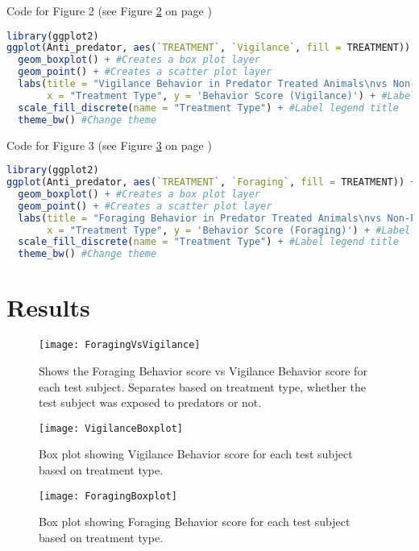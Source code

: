 \documentclass[letterpaper]{article}
\begin{document}
Code for Figure 2 (see Figure \ref{fig:2} on page \pageref{fig:2})
\begin{lstlisting}[language = R]
library(ggplot2)
ggplot(Anti_predator, aes(`TREATMENT`, `Vigilance`, fill = TREATMENT)) + #Using Anti_predator dataset, call for TREATMENT as my x-value and Vigilance for my y-values, also colors box plots based on treatment type
  geom_boxplot() + #Creates a box plot layer
  geom_point() + #Creates a scatter plot layer
  labs(title = "Vigilance Behavior in Predator Treated Animals\nvs Non-Predator Treated Animals",
       x = "Treatment Type", y = 'Behavior Score (Vigilance)') + #Label title, x-axis, and y-axis
  scale_fill_discrete(name = "Treatment Type") + #Label legend title
  theme_bw() #Change theme
\end{lstlisting}

Code for Figure 3 (see Figure \ref{fig:3} on page \pageref{fig:3})
\begin{lstlisting}[language = R]
library(ggplot2)
ggplot(Anti_predator, aes(`TREATMENT`, `Foraging`, fill = TREATMENT)) + #Using Anti_predator dataset, call for TREATMENT as my x-value and Foraging for my y-values, also colors box plots based on treatment type
  geom_boxplot() + #Creates a box plot layer 
  geom_point() + #Creates a scatter plot layer
  labs(title = "Foraging Behavior in Predator Treated Animals\nvs Non-Predator Treated Animals",
       x = "Treatment Type", y = 'Behavior Score (Foraging)') + #Label title, x-axis, and y-axis
  scale_fill_discrete(name = "Treatment Type") + #Label legend title
  theme_bw() #Change theme
\end{lstlisting}

\section*{Results}
\begin{figure}[h]
	\caption{Shows the Foraging Behavior score vs Vigilance Behavior score for each test subject. Separates based on treatment type, whether the test subject was exposed to predators or not.\label{fig:1}}
	\centering
	\texttt{[image: ForagingVsVigilance]}
\end{figure}
\begin{figure}[h]
	\caption{Box plot showing Vigilance Behavior score for each test subject based on treatment type.\label{fig:2}}
	\centering
	\texttt{[image: VigilanceBoxplot]}
\end{figure}
\begin{figure}[h]
	\caption{Box plot showing Foraging Behavior score for each test subject based on treatment type.\label{fig:3}}
	\centering
	\texttt{[image: ForagingBoxplot]}
\end{figure}
\clearpage
\end{document}
